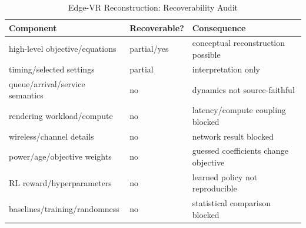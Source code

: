 \begin{table}[H]\centering\caption{Edge-VR Reconstruction: Recoverability Audit}\label{tab:reconstruction}\scriptsize\begin{tabularx}{\columnwidth}{p{}p{}Y}\toprule Component & Recoverable? & Consequence\\\midrule high-level objective/equations & partial/yes & conceptual reconstruction possible\\ timing/selected settings & partial & interpretation only\\ queue/arrival/service semantics & no & dynamics not source-faithful\\ rendering workload/compute & no & latency/compute coupling blocked\\ wireless/channel details & no & network result blocked\\ power/age/objective weights & no & guessed coefficients change objective\\ RL reward/hyperparameters & no & learned policy not reproducible\\ baselines/training/randomness & no & statistical comparison blocked\\\bottomrule\end{tabularx}\end{table}